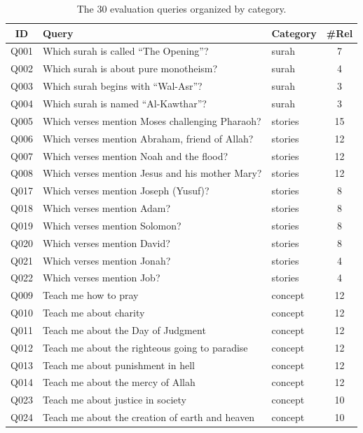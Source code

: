 \documentclass[conference]{IEEEtran}
\begin{document}
\begin{table}[t]
  \centering
  \caption{The 30 evaluation queries organized by category.}
  \label{tab:queries}
  \footnotesize
  \begin{tabular}{cllc}
    \toprule
    \textbf{ID} & \textbf{Query} & \textbf{Category} &
    \textbf{\#Rel} \\
    \midrule
    Q001 & Which surah is called ``The Opening''? & surah & 7 \\
    Q002 & Which surah is about pure monotheism? & surah & 4 \\
    Q003 & Which surah begins with ``Wal-Asr''? & surah & 3 \\
    Q004 & Which surah is named ``Al-Kawthar''? & surah & 3 \\
    \midrule
    Q005 & Which verses mention Moses challenging Pharaoh? & stories & 15 \\
    Q006 & Which verses mention Abraham, friend of Allah? & stories & 12 \\
    Q007 & Which verses mention Noah and the flood? & stories & 12 \\
    Q008 & Which verses mention Jesus and his mother Mary? & stories & 12 \\
    Q017 & Which verses mention Joseph (Yusuf)? & stories & 8 \\
    Q018 & Which verses mention Adam? & stories & 8 \\
    Q019 & Which verses mention Solomon? & stories & 8 \\
    Q020 & Which verses mention David? & stories & 8 \\
    Q021 & Which verses mention Jonah? & stories & 4 \\
    Q022 & Which verses mention Job? & stories & 4 \\
    \midrule
    Q009 & Teach me how to pray & concept & 12 \\
    Q010 & Teach me about charity & concept & 12 \\
    Q011 & Teach me about the Day of Judgment & concept & 12 \\
    Q012 & Teach me about the righteous going to paradise & concept & 12 \\
    Q013 & Teach me about punishment in hell & concept & 12 \\
    Q014 & Teach me about the mercy of Allah & concept & 12 \\
    Q023 & Teach me about justice in society & concept & 10 \\
    Q024 & Teach me about the creation of earth and heaven & concept & 10 \\

\end{tabular}
\end{table}
\end{document}

